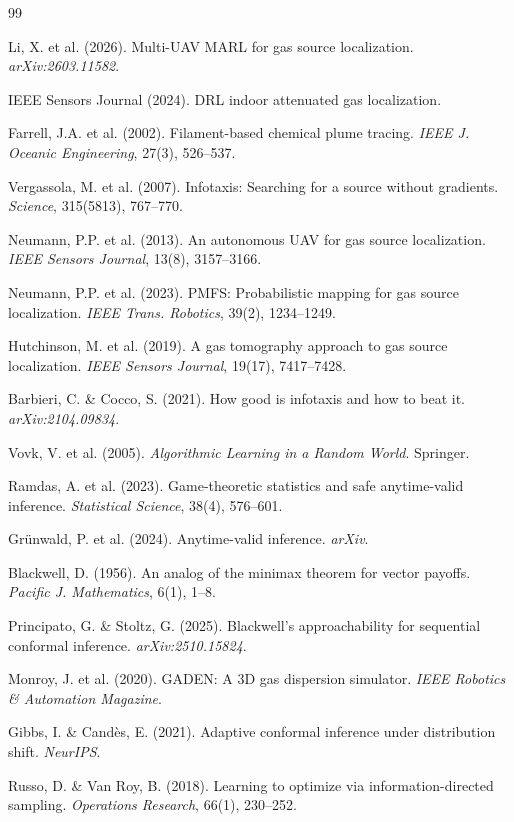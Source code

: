 \begin{thebibliography}{99}

 Li, X. et al. (2026). Multi-UAV MARL for gas source localization. \emph{arXiv:2603.11582}.

 IEEE Sensors Journal (2024). DRL indoor attenuated gas localization.

 Farrell, J.A. et al. (2002). Filament-based chemical plume tracing. \emph{IEEE J. Oceanic Engineering}, 27(3), 526--537.

 Vergassola, M. et al. (2007). Infotaxis: Searching for a source without gradients. \emph{Science}, 315(5813), 767--770.

 Neumann, P.P. et al. (2013). An autonomous UAV for gas source localization. \emph{IEEE Sensors Journal}, 13(8), 3157--3166.

 Neumann, P.P. et al. (2023). PMFS: Probabilistic mapping for gas source localization. \emph{IEEE Trans. Robotics}, 39(2), 1234--1249.

 Hutchinson, M. et al. (2019). A gas tomography approach to gas source localization. \emph{IEEE Sensors Journal}, 19(17), 7417--7428.

 Barbieri, C. \& Cocco, S. (2021). How good is infotaxis and how to beat it. \emph{arXiv:2104.09834}.

 Vovk, V. et al. (2005). \emph{Algorithmic Learning in a Random World}. Springer.

 Ramdas, A. et al. (2023). Game-theoretic statistics and safe anytime-valid inference. \emph{Statistical Science}, 38(4), 576--601.

 Gr\"unwald, P. et al. (2024). Anytime-valid inference. \emph{arXiv}.

 Blackwell, D. (1956). An analog of the minimax theorem for vector payoffs. \emph{Pacific J. Mathematics}, 6(1), 1--8.

 Principato, G. \& Stoltz, G. (2025). Blackwell's approachability for sequential conformal inference. \emph{arXiv:2510.15824}.

 Monroy, J. et al. (2020). GADEN: A 3D gas dispersion simulator. \emph{IEEE Robotics \& Automation Magazine}.

 Gibbs, I. \& Cand\`es, E. (2021). Adaptive conformal inference under distribution shift. \emph{NeurIPS}.

 Russo, D. \& Van Roy, B. (2018). Learning to optimize via information-directed sampling. \emph{Operations Research}, 66(1), 230--252.

\end{thebibliography}